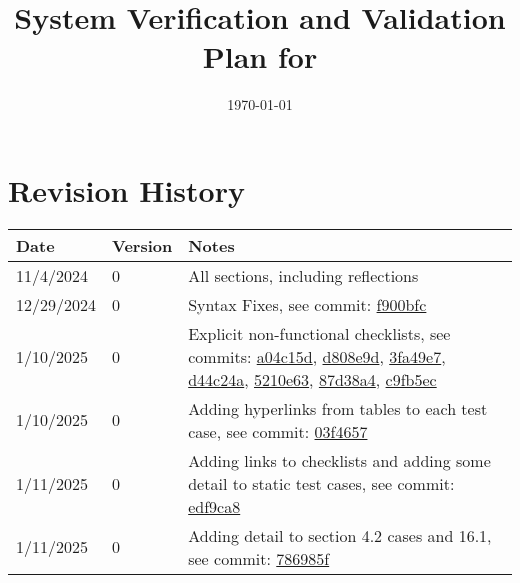 \documentclass[12pt, titlepage]{article}
\begin{document}
\title{System Verification and Validation Plan for \progname{}} 
\author{\authname}
\date{\today}
	
\maketitle


\section*{Revision History}

\begin{tabularx}{\textwidth}{p{3cm}p{2cm}X}
\toprule {\bf Date} & {\bf Version} & {\bf Notes}\\
\midrule
11/4/2024 & 0 & All sections, including reflections\\
12/29/2024 & 0 & Syntax Fixes, see commit: \href{https://github.com/ausbennett/mes-finance-platform/commit/f900bfcc4d9e7f00a11f5ef2cb3fc51444f0a35a}{f900bfc} \\
1/10/2025 & 0 & Explicit non-functional checklists, see commits: \href{https://github.com/ausbennett/mes-finance-platform/commit/a04c15d0b1c09c4224c563c3293413720992000f}{a04c15d}, \href{https://github.com/ausbennett/mes-finance-platform/commit/d808e9d9cd49ef1ed1cb8210c2dc9c4104ddce44}{d808e9d}, \href{https://github.com/ausbennett/mes-finance-platform/commit/3fa49e7e825be674502d894b7c3f5f5789a220a9}{3fa49e7}, \href{https://github.com/ausbennett/mes-finance-platform/commit/d44c24af07fa98c42ffa32eaa5be158184e4bdbb}{d44c24a}, \href{https://github.com/ausbennett/mes-finance-platform/commit/5210e638cce850094597302122300b1ecdeb1b8a}{5210e63}, \href{https://github.com/ausbennett/mes-finance-platform/commit/87d38a41281b2c3791dfdad6ed35bcc2a9a70e17}{87d38a4}, \href{https://github.com/ausbennett/mes-finance-platform/commit/c9fb5ec6efc33e2e0456f408a4c31286439dbf29}{c9fb5ec}\\
1/10/2025 & 0 & Adding hyperlinks from tables to each test case, see commit: \href{https://github.com/ausbennett/mes-finance-platform/commit/03f46579d128fbf9c896b3c4cba2601181f4d5c1}{03f4657}\\
1/11/2025 & 0 & Adding links to checklists and adding some detail to static test cases, see commit: \href{https://github.com/ausbennett/mes-finance-platform/commit/edf9ca8c99bdf0996fffb740ae9f95471e2ed388}{edf9ca8}\\
1/11/2025 & 0 & Adding detail to section 4.2 cases and 16.1, see commit: \href{https://github.com/ausbennett/mes-finance-platform/commit/786985f0ee446dd63166d37246a99ea111cc1b6a}{786985f}\\

\end{tabularx}
\end{document}
